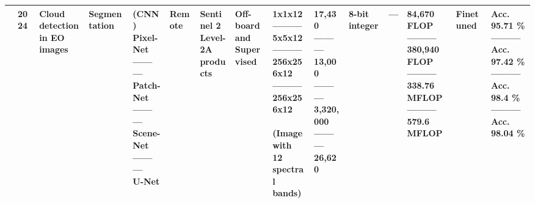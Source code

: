 \begin{center}
{\begin{tabular}{lllllllllllllll}
\cite{cratereEfficientFPGAacceleratedConvolutional2024} & 2024 & \makecell[tl]{Cloud detection\\ in EO images} & Segmentation & \makecell[tl]{(CNN)\\ Pixel-Net\\ ---------\\ Patch-Net\\ ---------\\ Scene-Net\\ ---------\\ U-Net} & Remote & \makecell[tl]{Sentinel 2\\ Level-2A\\ products} & \makecell[tl]{Off-board\\ and\\ Supervised} & \makecell[tl]{1x1x12\\ ---------\\ 5x5x12\\ ---------\\ 256x256x12\\ ---------\\ 256x256x12\\ \\ (Image with\\ 12 spectral\\ bands)} & \makecell[tl]{17,430\\ ---------\\ 13,000\\ ---------\\ 3,320,000\\ ---------\\ 26,620} & 8-bit integer & --- & \makecell[tl]{84,670 FLOP\\ ---------\\ 380,940 FLOP\\ ---------\\ 338.76 MFLOP\\ ---------\\ 579.6 MFLOP} & Finetuned & \makecell[tl]{Acc. 95.71 \%\\ ---------\\ Acc. 97.42 \%\\ ---------\\ Acc. 98.4 \%\\ ---------\\ Acc. 98.04 \%}  \\ \hline

\end{tabular}}
\end{center}
